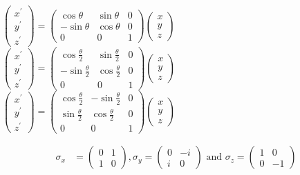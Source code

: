 \begin{enumerate}[label=\color{ocre}\textbf{\arabic*.}]
\begin{tasks}
		\task[\textbf{B.}] $\left(\begin{array}{l}x^{\prime} \\ y^{\prime} \\ z^{\prime}\end{array}\right)=\left(\begin{array}{ccc}\cos \theta & \sin \theta & 0 \\ -\sin \theta & \cos \theta & 0 \\ 0 & 0 & 1\end{array}\right)\left(\begin{array}{l}x \\ y \\ z\end{array}\right)$
		\task[\textbf{C.}] $\left(\begin{array}{l}x^{\prime} \\ y^{\prime} \\ z^{\prime}\end{array}\right)=\left(\begin{array}{ccc}\cos \frac{\theta}{2} & \sin \frac{\theta}{2} & 0 \\ -\sin \frac{\theta}{2} & \cos \frac{\theta}{2} & 0 \\ 0 & 0 & 1\end{array}\right)\left(\begin{array}{l}x \\ y \\ z\end{array}\right)$
		\task[\textbf{D.}] $\left(\begin{array}{l}x^{\prime} \\ y^{\prime} \\ z^{\prime}\end{array}\right)=\left(\begin{array}{ccc}\cos \frac{\theta}{2} & -\sin \frac{\theta}{2} & 0 \\ \sin \frac{\theta}{2} & \cos \frac{\theta}{2} & 0 \\ 0 & 0 & 1\end{array}\right)\left(\begin{array}{l}x \\ y \\ z\end{array}\right)$
	\end{tasks}
	\begin{answer}
		\begin{align*}
		\sigma_{x}&=\left(\begin{array}{ll}0 & 1 \\ 1 & 0\end{array}\right), \sigma_{y}=\left(\begin{array}{cc}0 & -i \\ i & 0\end{array}\right)\text{ and } \sigma_{z}=\left(\begin{array}{cc}1 & 0 \\ 0 & -1\end{array}\right)\\

\end{align*}
\end{answer}
\end{enumerate}
